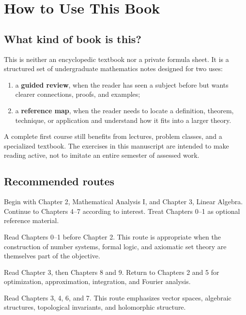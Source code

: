 \chapter*{How to Use This Book}

\section*{What kind of book is this?}

This is neither an encyclopedic textbook nor a private formula sheet. It is a structured set of undergraduate mathematics notes designed for two uses:
\begin{enumerate}
    \item a \textbf{guided review}, when the reader has seen a subject before but wants clearer connections, proofs, and examples;
    \item a \textbf{reference map}, when the reader needs to locate a definition, theorem, technique, or application and understand how it fits into a larger theory.
\end{enumerate}
A complete first course still benefits from lectures, problem classes, and a specialized textbook. The exercises in this manuscript are intended to make reading active, not to imitate an entire semester of assessed work.

\section*{Recommended routes}

\begin{description}[leftmargin=3.3cm,style=nextline]
    \item[Standard undergraduate route] Begin with Chapter 2, Mathematical Analysis I, and Chapter 3, Linear Algebra. Continue to Chapters 4--7 according to interest. Treat Chapters 0--1 as optional reference material.
    \item[Foundations route] Read Chapters 0--1 before Chapter 2. This route is appropriate when the construction of number systems, formal logic, and axiomatic set theory are themselves part of the objective.
    \item[Computation and data route] Read Chapter 3, then Chapters 8 and 9. Return to Chapters 2 and 5 for optimization, approximation, integration, and Fourier analysis.
    \item[Structure route] Read Chapters 3, 4, 6, and 7. This route emphasizes vector spaces, algebraic structures, topological invariants, and holomorphic structure.
\end{description}


